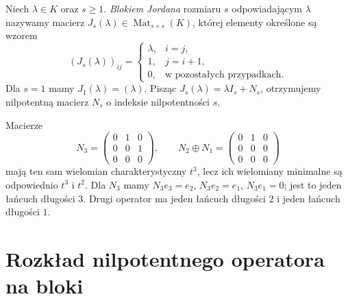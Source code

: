\begin{definicja}
\label{def:lin17-jordan-block}
Niech \(\lambda\in K\) oraz \(s\ge1\).
\emph{Blokiem Jordana} rozmiaru \(s\)
odpowiadającym \(\lambda\) nazywamy
macierz \(J_s(\lambda)\in\operatorname{Mat}_{s\times s}(K)\),
której elementy określone są wzorem
\[
 (J_s(\lambda))_{ij}=
 \begin{cases}
 \lambda,&i=j,\\
 1,&j=i+1,\\
 0,&\text{w pozostałych przypadkach}.
 \end{cases}
\]
Dla \(s=1\) mamy \(J_1(\lambda)=(\lambda)\).
Pisząc \(J_s(\lambda)=\lambda I_s+N_s\),
otrzymujemy nilpotentną macierz \(N_s\)
o indeksie nilpotentności \(s\).
\end{definicja}

\begin{przyklad}
\label{prz:lin17-nilpotent-blocks}
Macierze
\[
 N_3=\begin{pmatrix}0&1&0\\0&0&1\\0&0&0\end{pmatrix},
 \qquad
 N_2\oplus N_1=
 \begin{pmatrix}0&1&0\\0&0&0\\0&0&0\end{pmatrix}
\]
mają ten sam wielomian charakterystyczny \(t^3\),
lecz ich wielomiany minimalne są odpowiednio
\(t^3\) i \(t^2\).
Dla \(N_3\) mamy
\(N_3e_3=e_2\), \(N_3e_2=e_1\),
\(N_3e_1=0\); jest to jeden łańcuch długości \(3\).
Drugi operator ma jeden łańcuch długości \(2\)
i jeden łańcuch długości \(1\).
\end{przyklad}

\section{Rozkład nilpotentnego operatora na bloki}
\label{sec:lin17-nilpotent-jordan}

